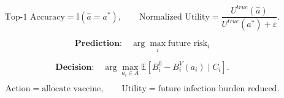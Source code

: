 \documentclass[15pt]{extarticle}
\begin{document}
\vspace{0.18cm}

\begin{tcolorbox}
\[
\text{Top-1 Accuracy}
=
\mathbb{I}(\hat{a}=a^*),
\qquad
\text{Normalized Utility}
=
\frac{U^{true}(\hat{a})}{U^{true}(a^*)+\varepsilon}.
\]
\end{tcolorbox}

\vspace{0.10cm}

\begin{minipage}[t]{0.47\textwidth}
\[
\textbf{Prediction:}
\quad
\arg\max_i \text{future risk}_i
\]
\end{minipage}
\hfill
\begin{minipage}[t]{0.47\textwidth}
\[
\textbf{Decision:}
\quad
\arg\max_{a_i\in A}
\mathbb{E}\!\left[
B_i^0-B_i^V(a_i)\mid C_i
\right].
\]
\end{minipage}

\vspace{0.10cm}

\[
\text{Action}=\text{allocate vaccine},
\qquad
\text{Utility}=\text{future infection burden reduced}.
\]
\end{document}
